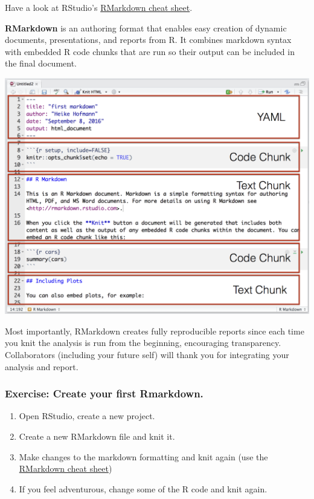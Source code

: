 \documentclass[
]{book}
\providecommand{\tightlist}{%
  \setlength{\itemsep}{0pt}\setlength{\parskip}{0pt}}
\begin{document}
Have a look at RStudio's \href{https://www.rstudio.com/resources/cheatsheets/}{RMarkdown cheat sheet}.

\textbf{RMarkdown} is an authoring format that enables easy creation of dynamic documents, presentations, and reports from R. It combines markdown syntax with embedded R code chunks that are run so their output can be included in the final document.

\includegraphics[width=19.36in]{img/rmarkdown}

Most importantly, RMarkdown creates fully reproducible reports since each time you knit the analysis is run from the beginning, encouraging transparency. Collaborators (including your future self) will thank you for integrating your analysis and report.

\hypertarget{exercise-create-your-first-rmarkdown.}{%
\subsubsection*{Exercise: Create your first Rmarkdown.}\label{exercise-create-your-first-rmarkdown.}}

\begin{enumerate}
\def\labelenumi{\arabic{enumi}.}
\tightlist
\item
  Open RStudio, create a new project.
\item
  Create a new RMarkdown file and knit it.
\item
  Make changes to the markdown formatting and knit again (use the \href{https://www.rstudio.com/resources/cheatsheets/}{RMarkdown cheat sheet})
\item
  If you feel adventurous, change some of the R code and knit again.
\end{enumerate}
\end{document}
